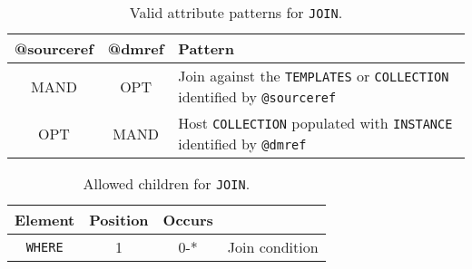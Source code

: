\begin{table}[!htbp]
\small
\centering
\begin{tabulary}{\linewidth}{|c|c|J|}
    \hline 
        \textbf{@sourceref } &
        \textbf{@dmref} &
        \textbf{Pattern}\\
    \hline      \hline  
        MAND &           
        OPT &           
        Join against the \texttt{TEMPLATES} or \texttt{COLLECTION} identified by \texttt{@sourceref}  \\  
    \hline   
        OPT &           
        MAND &      
        Host \texttt{COLLECTION} populated with \texttt{INSTANCE}  identified by \texttt{@dmref} \\
   \hline 
\end{tabulary}
     \caption{Valid attribute patterns for  \texttt{JOIN}.}
     \label{tbl:join-pattern}
\end{table}


\begin{table}[!htbp]
\small
\centering
\begin{tabulary}{\linewidth}{|c |c |c|J|}
    \hline 
        \textbf{Element} &
        \textbf{Position} &
        \textbf{Occurs} &
        \\
    \hline      \hline  
        \texttt{WHERE}  &        
        1 &           
        0-* &
         Join condition\\
    \hline 
\end{tabulary}
     \caption{Allowed children for \texttt{JOIN}.} 
     \label{tbl:join-chidlren}
 \end{table}
